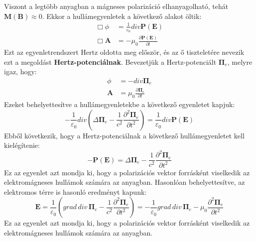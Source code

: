 \documentclass[../main.tex]{subfiles}
\begin{document}
Viszont a legtöbb anyagban a mágneses polarizáció elhanyagolható, tehát $\mathbf{M}(\mathbf{B}) \approx 0$. Ekkor a hullámegyenletek a következő alakot öltik:
\begin{equation}
    \begin{aligned}
        \Box \phi &= \frac{1}{\varepsilon_0} div \mathbf{P}(\mathbf{E}) \\
        \Box \mathbf{A} &= - \mu_0 \frac{\partial \mathbf{P}(\mathbf{E})}{\partial t}
    \end{aligned}
\end{equation}
Ezt az egyenletrendszert Hertz oldotta meg először, és az ő tiszteletére nevezik ezt a megoldást \textbf{Hertz-potenciálnak}. Bevezetjük a Hertz-potenciált $\mathbf{\Pi}_e$, melyre igaz, hogy:
\begin{equation}
    \begin{aligned}
        \phi &= - div \mathbf{\Pi}_e \\
        \mathbf{A} &= \mu_0 \frac{\partial \mathbf{\Pi}_e}{\partial t}
    \end{aligned}
\end{equation}
Ezeket behelyettesítve a hullámegyenletekbe a következő egyenletet kapjuk:
\begin{equation}
    - \frac{1}{\varepsilon_0} div \left(\Delta \mathbf{\Pi}_e - \frac{1}{c^2} \frac{\partial^2 \mathbf{\Pi}_e}{\partial t^2}\right) = \frac{1}{\varepsilon_0} div \mathbf{P}(\mathbf{E})
\end{equation}
Ebből következik, hogy a Hertz-potenciálnak a következő hullámegyenletet kell kielégítenie:
\begin{equation}
    \boxed{
    - \mathbf{P}(\mathbf{E}) = \Delta \mathbf{\Pi}_e - \frac{1}{c^2} \frac{\partial^2 \mathbf{\Pi}_e}{\partial t^2}
    }
\end{equation}
Ez az egyenlet azt mondja ki, hogy a polarizációs vektor forrásként viselkedik az elektromágneses hullámok számára az anyagban. Hasonlóan behelyettesítve, az elektromos térre is hasonló eredményt kapunk:
\begin{equation}
    \boxed{
    \mathbf{E} = \frac{1}{\varepsilon_0} \left(grad \, div \, \mathbf{\Pi}_e - \frac{1}{c^2} \frac{\partial^2 \mathbf{\Pi}_e}{\partial t^2}\right)
    } = - \frac{1}{\varepsilon_0} grad \, div \, \mathbf{\Pi}_e - \mu_0 \frac{\partial^2 \mathbf{\Pi}_e}{\partial t^2}
\end{equation}
Ez az egyenlet azt mondja ki, hogy a polarizációs vektor forrásként viselkedik az elektromágneses hullámok számára az anyagban.
\end{document}
